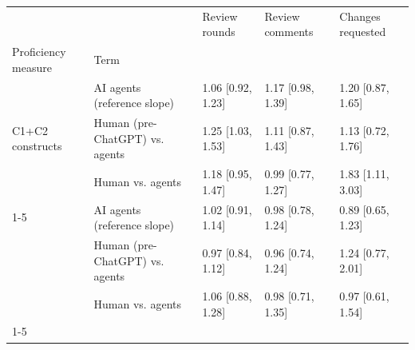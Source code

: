 \begin{tabular}{lllll}
\toprule
 &  & Review rounds & Review comments & Changes requested \\
Proficiency measure & Term &  &  &  \\
\midrule
\multirow[t]{3}{*}{C1+C2 constructs} & AI agents (reference slope) & 1.06 [0.92, 1.23] & 1.17 [0.98, 1.39] & 1.20 [0.87, 1.65] \\
 & Human (pre-ChatGPT) vs. agents & 1.25 [1.03, 1.53] & 1.11 [0.87, 1.43] & 1.13 [0.72, 1.76] \\
 & Human vs. agents & 1.18 [0.95, 1.47] & 0.99 [0.77, 1.27] & 1.83 [1.11, 3.03] \\
\cline{1-5}
\multirow[t]{3}{*}{Ordinal CEFR mean} & AI agents (reference slope) & 1.02 [0.91, 1.14] & 0.98 [0.78, 1.24] & 0.89 [0.65, 1.23] \\
 & Human (pre-ChatGPT) vs. agents & 0.97 [0.84, 1.12] & 0.96 [0.74, 1.24] & 1.24 [0.77, 2.01] \\
 & Human vs. agents & 1.06 [0.88, 1.28] & 0.98 [0.71, 1.35] & 0.97 [0.61, 1.54] \\
\cline{1-5}
\bottomrule
\end{tabular}
